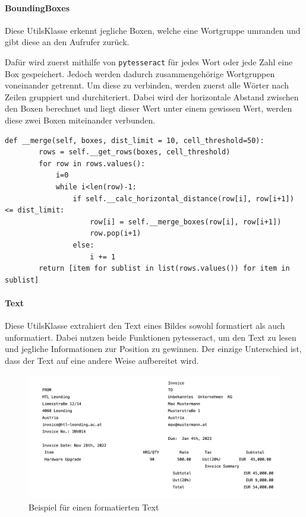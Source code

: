 \paragraph{BoundingBoxes}

Diese UtilsKlasse erkennt jegliche Boxen, welche eine Wortgruppe umranden und gibt diese an den Aufrufer zurück.

Dafür wird zuerst mithilfe von \lstinline{pytesseract} für jedes Wort oder jede Zahl eine Box gespeichert. Jedoch werden dadurch zusammengehörige Wortgruppen voneinander getrennt. Um diese zu verbinden, werden zuerst alle Wörter nach Zeilen gruppiert und durchiteriert. Dabei wird der horizontale Abstand zwischen den Boxen berechnet und liegt dieser Wert unter einem gewissen Wert, werden diese zwei Boxen miteinander verbunden.

\begin{lstlisting}[caption={Syntax um zusammengehörige Wortgruppen zu verbinden}]
    def __merge(self, boxes, dist_limit = 10, cell_threshold=50):
        rows = self.__get_rows(boxes, cell_threshold)
        for row in rows.values():
            i=0
            while i<len(row)-1:
                if self.__calc_horizontal_distance(row[i], row[i+1]) <= dist_limit:
                    row[i] = self.__merge_boxes(row[i], row[i+1])
                    row.pop(i+1)
                else:
                    i += 1
        return [item for sublist in list(rows.values()) for item in sublist]
\end{lstlisting}

\paragraph{Text}

Diese UtilsKlasse extrahiert den Text eines Bildes sowohl formatiert als auch unformatiert. Dabei nutzen beide Funktionen pytesseract, um den Text zu lesen und jegliche Informationen zur Position zu gewinnen. Der einzige Unterschied ist, dass der Text auf eine andere Weise aufbereitet wird.

\begin{figure}[H]
    \centering
    \includegraphics[scale=0.3]{sections/implementation/images/formated.png}
    \caption{Beispiel für einen formatierten Text}
\end{figure}

